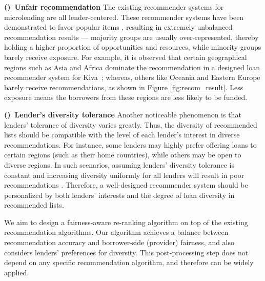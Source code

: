 
\textbf{()~Unfair recommendation} The existing recommender systems for microlending are all lender-centered. These recommender systems have been demonstrated to favor popular items \cite{celma2008hits,lee2014fairness}, resulting in extremely unbalanced recommendation results --- majority groups are usually over-represented, thereby holding a higher proportion of opportunities and resources, while minority groups barely receive exposure. For example, it is observed that certain geographical regions such as Asia and Africa dominate the recommendation in a designed loan recommender system for Kiva~\cite{choo2014gather}; whereas, others like Oceania and Eastern Europe barely receive recommendations, as shown in Figure \ref{fig:recom_result}. Less exposure means the borrowers from these regions are less likely to be funded.


\textbf{()~Lender's diversity tolerance} Another noticeable phenomenon is that lenders' tolerance of diversity varies greatly.  Thus, the diversity of recommended lists should be compatible with the level of each lender's interest in diverse recommendations. For instance, some lenders may highly prefer offering loans to certain regions (such as their home countries), while others may be open to diverse regions. In such scenarios, assuming lenders' diversity tolerance is constant and increasing diversity uniformly for all lenders will result in poor recommendations \cite{eskandanian2017clustering}. Therefore, a well-designed recommender system should be personalized by both lenders' interests and the degree of loan diversity in recommended lists.

We aim to design a fairness-aware re-ranking algorithm on top of the existing recommendation algorithms. Our algorithm achieves a balance between recommendation accuracy and borrower-side (provider) fairness, and also considers lenders' preferences for diversity. This post-processing step does not depend on any specific recommendation algorithm, and therefore can be widely applied.


